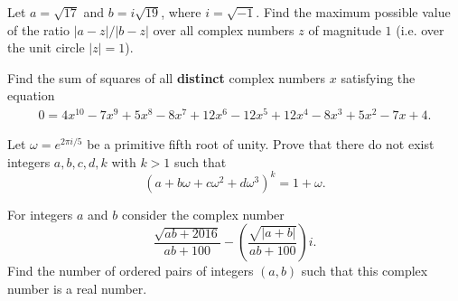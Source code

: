 \documentclass[11pt]{article}
\theoremstyle{definition}
\begin{document}
%	



\begin{question}[name={2015 HMMT, Guts, Problem 26}]
	Let $a =\sqrt{17}$ and $b=i\sqrt{19}$, where $i=\sqrt{-1}$. Find the maximum possible value of the ratio $|a-z|/|b-z|$ over all complex numbers $z$ of magnitude $1$ (i.e. over the unit circle $|z|=1$).
\end{question}


%	






\begin{question}[name={2015 HMMT, Guts, Problem 30}]
	Find the sum of squares of all \textbf{distinct} complex numbers $x$ satisfying the equation
	\begin{align*}
		0 = 4x^{10} - 7x^{9} + 5x^8 - 8x^7 + 12x^6 - 12x^5 + 12x^4 - 8x^3 + 5x^2 - 7x + 4.
	\end{align*}
\end{question}


%	

\begin{question}[name={2015 HMIC, \href{https://artofproblemsolving.com/community/c129h1082121p4761636}{Problem 5}}]
	Let $\omega = e^{2\pi i /5}$ be a primitive fifth root of unity. Prove that there do not exist integers $a, b, c, d, k$ with $k > 1$ such that\[(a + b \omega + c \omega^2 + d \omega^3)^{k}=1+\omega.\]
\end{question}


%	



\begin{question}[name={2016 AIME I, \href{https://artofproblemsolving.com/community/c4p5966163}{Problem 7}}]
	For integers $a$ and $b$ consider the complex number\[\dfrac{\sqrt{ab+2016}}{ab+100} - \left(\frac{\sqrt{|a+b|}}{ab+100}\right)i.\]Find the number of ordered pairs of integers $(a, b)$ such that this complex number is a real number.
\end{question}
\end{document}
